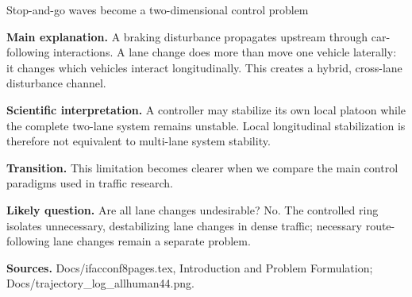 \documentclass[aspectratio=169,11pt]{beamer}
\begin{document}
\begin{frame}[shrink=8]{Stop-and-go waves become a two-dimensional control problem}
{    \textbf{Main explanation.} A braking disturbance propagates upstream through car-following interactions. A lane change does more than move one vehicle laterally: it changes which vehicles interact longitudinally. This creates a hybrid, cross-lane disturbance channel.

    \textbf{Scientific interpretation.} A controller may stabilize its own local platoon while the complete two-lane system remains unstable. Local longitudinal stabilization is therefore not equivalent to multi-lane system stability.

    \textbf{Transition.} This limitation becomes clearer when we compare the main control paradigms used in traffic research.

    \textbf{Likely question.} Are all lane changes undesirable? No. The controlled ring isolates unnecessary, destabilizing lane changes in dense traffic; necessary route-following lane changes remain a separate problem.

    \textbf{Sources.} Docs/ifacconf8pages.tex, Introduction and Problem Formulation; Docs/trajectory\_log\_allhuman44.png.
  }
\end{frame}
\end{document}
